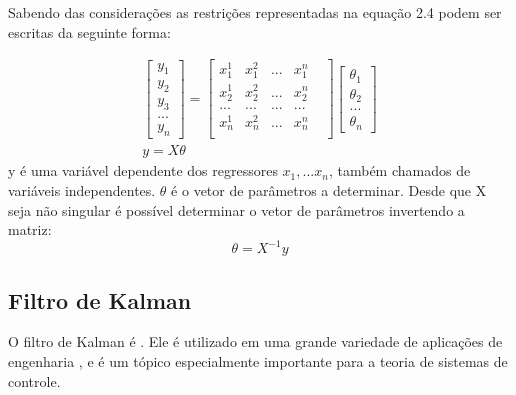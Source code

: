 Sabendo das considerações as restrições representadas na equação 2.4 podem ser escritas da seguinte forma:

\begin{equation}
\begin{array}{c}
\begin{bmatrix}
y_1 \\ y_2 \\ y_3\\ ... \\ y_n
\end{bmatrix}
=
\begin{bmatrix}
x^1_1 & x^2_1 & ... & x^n_1\\
x^1_2 & x^2_2 & ... & x^n_2\\
... & ... & ...& ...&\\
x^1_n & x^2_n & ... & x^n_n\\
\end{bmatrix}
\begin{bmatrix}
\theta_1 \\ \theta_2 \\ ... \\ \theta_n
\end{bmatrix}
\\
y=X \theta
\end{array}
\end{equation}
y é uma variável dependente  dos regressores $x_1,... x_n$, também chamados de variáveis independentes. $\theta$ é o vetor de parâmetros a determinar. Desde que X seja não singular é possível determinar o vetor de parâmetros invertendo a matriz:
\begin{equation}
\theta=X^{-1}y
\end{equation}


\subsection {Filtro de Kalman}
O filtro de Kalman é . Ele é utilizado em uma grande variedade de aplicações de engenharia , e é um tópico especialmente importante para a teoria de sistemas de controle. 
